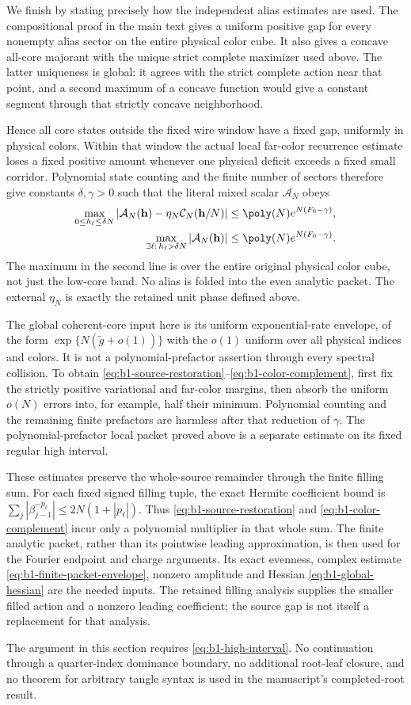 We finish by stating precisely how the independent alias estimates are
used. The compositional proof in the main text gives a uniform positive
gap for every nonempty alias sector on the entire physical color cube.
It also gives a concave all-core majorant with the unique strict complete
maximizer used above. The latter uniqueness is global: it agrees with the
strict complete action near that point, and a second maximum of a concave
function would give a constant segment through that strictly concave
neighborhood.

Hence all core states outside the fixed wire window have a fixed gap,
uniformly in physical colors. Within that window the actual local
far-color recurrence estimate loses a fixed positive amount whenever
one physical deficit exceeds a fixed small corridor. Polynomial state
counting and the finite number of sectors therefore give constants
$\delta,\gamma>0$ such that the literal mixed scalar $\mathcal A_N$ obeys
\begin{align}
 \max_{0\le h_\ell\le\delta N}
 \left|\mathcal A_N(\mathbf h)-
          \eta_N\mathcal C_N(\mathbf h/N)\right|
 &\le\poly(N)e^{N(F_0-\gamma)},
 \label{eq:b1-source-restoration}\\
 \max_{\exists\ell:\,h_\ell>\delta N}
 |\mathcal A_N(\mathbf h)|
 &\le\poly(N)e^{N(F_0-\gamma)}.
 \label{eq:b1-color-complement}
\end{align}
The maximum in the second line is over the entire original physical
color cube, not just the low-core band. No alias is folded into the even
analytic packet. The external $\eta_N$ is exactly the retained unit
phase defined above.

The global coherent-core input here is its uniform exponential-rate
envelope, of the form $\exp\{N(\widetilde g+o(1))\}$ with the
$o(1)$ uniform over all physical indices and colors. It is not a
polynomial-prefactor assertion through every spectral collision.
To obtain \eqref{eq:b1-source-restoration}--\eqref{eq:b1-color-complement},
first fix the strictly positive variational and far-color margins, then
absorb the uniform $o(N)$ errors into, for example, half their minimum.
Polynomial counting and the remaining finite prefactors are harmless
after that reduction of $\gamma$. The polynomial-prefactor local packet
proved above is a separate estimate on its fixed regular high interval.

These estimates preserve the whole-source remainder through the finite
filling sum. For each fixed signed filling tuple, the exact Hermite
coefficient bound is $\sum_j|\beta_{j-1}^{-p_\ell}|\le2N(1+|p_\ell|)$.
Thus \eqref{eq:b1-source-restoration} and
\eqref{eq:b1-color-complement} incur only a polynomial multiplier in
that whole sum. The finite analytic packet, rather than its pointwise
leading approximation, is then used for the Fourier endpoint and charge
arguments. Its exact evenness, complex estimate
\eqref{eq:b1-finite-packet-envelope}, nonzero amplitude and Hessian
\eqref{eq:b1-global-hessian} are the needed inputs. The retained filling
analysis supplies the smaller filled action and a nonzero leading
coefficient; the source gap is not itself a replacement for that analysis.

The argument in this section requires
\eqref{eq:b1-high-interval}. No continuation through a quarter-index
dominance boundary, no additional root-leaf closure, and no theorem for
arbitrary tangle syntax is used in the manuscript's completed-root result.
